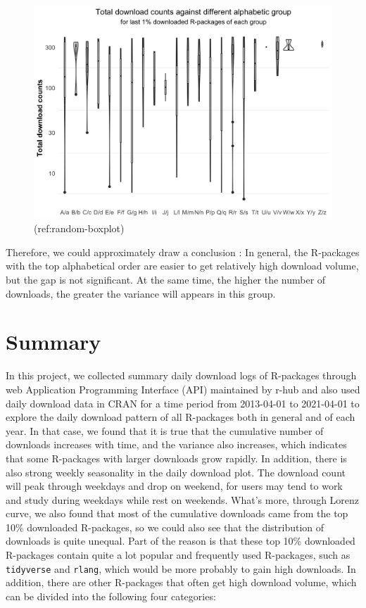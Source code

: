 \documentclass[
]{book}
\begin{document}
\begin{figure}

{\centering \includegraphics{figures/lowdownload-boxplot-1} 

}

\caption{(ref:random-boxplot)}\label{fig:lowdownload-boxplot}
\end{figure}

Therefore, we could approximately draw a conclusion : In general, the R-packages with the top alphabetical order are easier to get relatively high download volume, but the gap is not significant. At the same time, the higher the number of downloads, the greater the variance will appears in this group.

\hypertarget{summary}{%
\chapter{Summary}\label{summary}}

In this project, we collected summary daily download logs of R-packages through web Application Programming Interface (API) maintained by r-hub\autocite{rhub} and also used daily download data in CRAN for a time period from 2013-04-01 to 2021-04-01 to explore the daily download pattern of all R-packages both in general and of each year. In that case, we found that it is true that the cumulative number of downloads increases with time, and the variance also increases, which indicates that some R-packages with larger downloads grow rapidly. In addition, there is also strong weekly seasonality in the daily download plot. The download count will peak through weekdays and drop on weekend, for users may tend to work and study during weekdays while rest on weekends. What's more, through Lorenz curve, we also found that most of the cumulative downloads came from the top 10\% downloaded R-packages, so we could also see that the distribution of downloads is quite unequal. Part of the reason is that these top 10\% downloaded R-packages contain quite a lot popular and frequently used R-packages, such as \texttt{tidyverse} and \texttt{rlang}, which would be more probably to gain high downloads. In addition, there are other R-packages that often get high download volume, which can be divided into the following four categories:
\end{document}
